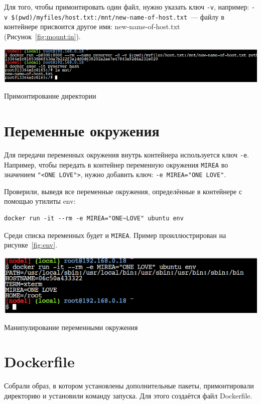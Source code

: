 Для того, чтобы примонтировать один файл, нужно указать ключ \texttt{-v},
например:
\verb|-v $(pwd)/myfiles/host.txt:/mnt/new-name-of-host.txt|~--- файлу
в контейнере присвоится другое имя: new-name-of-host.txt
(Рисунок~\ref{fig:mount:in}).

\begin{image}
	\includegraphics[width=1\textwidth]{Screenshot from 2023-04-15 16-24-49}
	\caption{Примонтирование директории}
	\label{fig:mount:in}
\end{image}

\section{Переменные окружения}
Для передачи переменных окружения внутрь контейнера используется ключ
\texttt{-e}. Например, чтобы передать в контейнер переменную окружения
\texttt{MIREA} во значением \texttt{"<ONE~LOVE">}, нужно добавить
ключ: \texttt{-e~MIREA="ONE~LOVE"}.\par
Проверили, выведя все переменные окружения, определённые в контейнере
с помощью утилиты env:

\begin{verbatim}
docker run -it --rm -e MIREA="ONE~LOVE" ubuntu env
\end{verbatim}

Среди списка переменных будет и \texttt{MIREA}.
Пример проиллюстрирован на рисунке~\ref{fig:env}.

\begin{image}
	\includegraphics[width=1\textwidth]{Screenshot from 2023-04-15 16-26-19}
	\caption{Манипулирование переменными окружения}
	\label{fig:env}
\end{image}

\section{Dockerfile}
Собрали образ, в котором установлены дополнительные пакеты,
примонтировали директорию и установили команду запуска.
Для этого создаётся файл Dockerfile.

